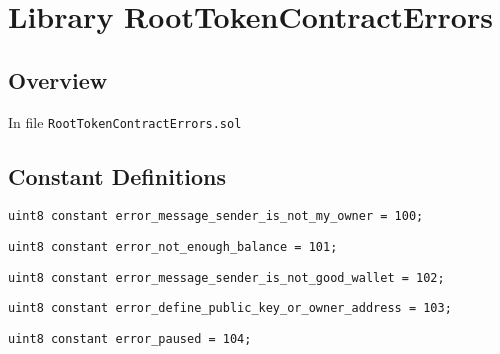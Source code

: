 
\chapter{Library RootTokenContractErrors}

\minitoc

\section{Overview}


In file {\tt RootTokenContractErrors.sol}

\section{Constant Definitions}


\begin{lstlisting}[firstnumber=4]
    uint8 constant error_message_sender_is_not_my_owner = 100;
\end{lstlisting}

\begin{lstlisting}[firstnumber=5]
    uint8 constant error_not_enough_balance = 101;
\end{lstlisting}

\begin{lstlisting}[firstnumber=6]
    uint8 constant error_message_sender_is_not_good_wallet = 102;
\end{lstlisting}

\begin{lstlisting}[firstnumber=7]
    uint8 constant error_define_public_key_or_owner_address = 103;
\end{lstlisting}

\begin{lstlisting}[firstnumber=8]
    uint8 constant error_paused = 104;
\end{lstlisting}
